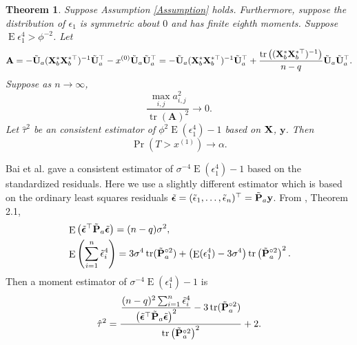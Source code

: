 \documentclass[bj]{imsart}
\DeclareMathOperator{\mytr}{tr}
\DeclareMathOperator{\myE}{E}
\newcommand{\By}{\mathbf{y}}    \newcommand{\Bz}{\mathbf{z}}
\newcommand{\BA}{\mathbf{A}}    \newcommand{\BB}{\mathbf{B}}    \newcommand{\BC}{\mathbf{C}}    \newcommand{\BD}{\mathbf{D}}    \newcommand{\BE}{\mathbf{E}}    \newcommand{\BF}{\mathbf{F}}    \newcommand{\BG}{\mathbf{G}}    \newcommand{\BH}{\mathbf{H}}    \newcommand{\BI}{\mathbf{I}}    \newcommand{\BJ}{\mathbf{J}}    \newcommand{\BK}{\mathbf{K}}    \newcommand{\BL}{\mathbf{L}}
\theoremstyle{plain}
\newtheorem{theorem}{\quad\quad Theorem}
\theoremstyle{definition}
\theoremstyle{remark}
\begin{document}
\begin{theorem}
    Suppose Assumption \ref{Assumption} holds.
    Furthermore,
    suppose the distribution of $\epsilon_1$ is symmetric about $0$ and has finite eighth moments.
    Suppose $\myE \epsilon_1^4> \phi^{-2}$.
Let
    \begin{equation*}
        \BA=
 -\tilde{\BU}_a ( \BX_b^* \BX_b^{*\top} )^{-1} \tilde{\BU}_a^\top 
-x^{(0)}\tilde{\BU}_a \tilde{\BU}_a^\top
        =
        -\tilde{\BU}_a (\BX_{b}^* \BX_b^{*\top})^{-1} \tilde{\BU}_a^\top 
        + \frac{\mytr\left( (\BX_b^* \BX_b^{*\top})^{-1} \right)}{n-q}\tilde{\BU}_a \tilde{\BU}_a^\top
        .
    \end{equation*}
    Suppose as $n\to \infty$,
    \begin{equation}\label{eq:jianchiCondition}
        \frac{ 
            \max_{i,j}a_{i,j}^2
    }{\mytr \left(
                \BA \right)^2}  \to 0.
    \end{equation}
        Let $\hat \tau^2$ be an consistent estimator of $\phi^2 \myE (\epsilon_1^4)-1$ based on $\mathbf{X}$, $\By$.
        Then 
    \begin{equation*}
        \Pr\left( T >
            x^{(1)}
    \right)
            \to \alpha.
    \end{equation*}
    \label{thm:criticalValue}
\end{theorem}

Bai {\rm et al.} \cite{Bai2017} gave a consistent estimator of $\sigma^{-4} \myE (\epsilon_1^4)-1$  based on the standardized residuals.
        Here we use a slightly different estimator which is based on the ordinary least squares residuals $\tilde \bepsilon=(\tilde \epsilon_1,\ldots, \tilde \epsilon_n)^\top= \tilde \BP_a \By$.
    From \cite{Bai2017}, Theorem 2.1, 
    \begin{align*}
        &\myE \left( \tilde \bepsilon^\top  \tilde \BP_a \tilde \bepsilon \right)
        = (n-q) \sigma^2,
        \\
        &\myE \left( \sum_{i=1}^n \tilde \epsilon_i^4 \right)
        =
        3\sigma^4 \mytr (\tilde \BP_a^{\circ 2}) 
        +\left( \myE (\epsilon_1^4)-3 \sigma^{4}\right)
        \mytr \left( \tilde \BP_a^{\circ 2}  \right)^2.
    \end{align*}
    Then a moment estimator of $\sigma^{-4}\myE (\epsilon_1^4)-1$ is 
\begin{equation*}
    \hat \tau^2 =
    \frac{
        \displaystyle\frac{(n-q)^2 \sum_{i=1}^n \tilde{\epsilon}_i^4}{\left( \tilde \bepsilon^\top \tilde \BP_a  \tilde \bepsilon \right)^2}
        - 3\mytr (\tilde \BP_a^{\circ 2})
    }{
        \mytr\left(  \tilde \BP_a^{\circ 2} \right)^2
    }
    +2.
\end{equation*}
\end{document}
